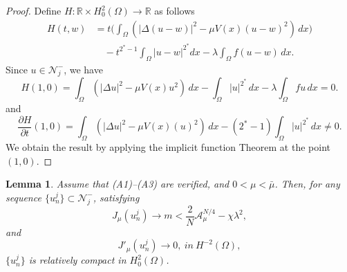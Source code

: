\documentclass[10pt,a4paper]{amsart}
\numberwithin{equation}{section}
\newtheorem{lemma}[theorem]{Lemma}
\begin{document}
\begin{proof}
Define \(H:\mathbb{R} \times H^2_0(\Omega) \to \mathbb{R}\) as follows
\begin{align*}
 H(t,w)
 &=t\Big( \int_{\Omega}\left( |\Delta (u-w)|^2-\mu V(x)(u-w)^2\right)\,dx\Big)\\
 & \quad-t^{2^*-1}\int_{\Omega} |u-w|^{2^*}dx-\lambda \int_{\Omega} f(u-w)\,dx.
 \end{align*}
Since \(u\in \mathcal{N}^-_j\), we have
 \[
 H(1,0)= \int_{\Omega} \left( |\Delta u|^2-\mu V(x)u^2\right)\,dx -\int_{\Omega} |u|^{2^*}\,dx-\lambda \int_{\Omega} f u\,dx=0.
 \]
 and
 \[
 \frac{\partial H}{\partial t}(1,0)=\int_{\Omega} 
 \left( |\Delta u|^2-\mu V(x)(u)^2\right)\,dx-(2^*-1)\int_{\Omega} |u|^{2^*}\,dx \neq 0.
 \]
 We obtain the result by applying the implicit function Theorem at the point 
 \((1,0) \).
 \end{proof}
 
\begin{lemma}\label{l5}
Assume that {\rm (A1)--(A3)} are verified, and \(0<\mu<\bar{\mu}\). Then, for any 
sequence \(\{u_n^j\} \subset \mathcal{N}^-_j\), satisfying
 \[
 J_{\mu}(u_n^j)\to m<\frac{2}{N}\mathcal{A}_{\mu}^{N/4}-\chi \lambda^2,
 \]
 and
 \begin{equation}\label{p4}
 J'_{\mu}(u_n^j)\to 0, \ in \ H^{-2}(\Omega),
 \end{equation}
 \(\{u_n^j\}\) is relatively compact in \(H^{2}_0(\Omega)\).
 \end{lemma}
 
\end{document}
